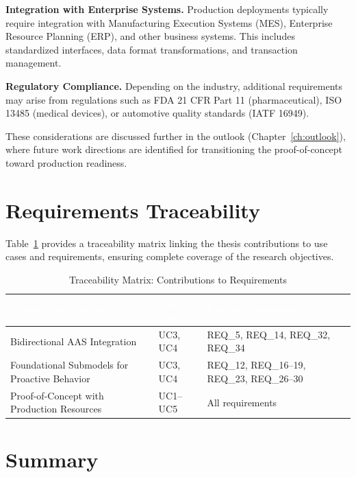\textbf{Integration with Enterprise Systems.} Production deployments typically require integration with Manufacturing Execution Systems (MES), Enterprise Resource Planning (ERP), and other business systems. This includes standardized interfaces, data format transformations, and transaction management.

\textbf{Regulatory Compliance.} Depending on the industry, additional requirements may arise from regulations such as FDA 21 CFR Part 11 (pharmaceutical), ISO 13485 (medical devices), or automotive quality standards (IATF 16949).

These considerations are discussed further in the outlook (Chapter~\ref{ch:outlook}), where future work directions are identified for transitioning the proof-of-concept toward production readiness.

\section{Requirements Traceability}
\label{sec:traceability}

Table~\ref{tab:traceability} provides a traceability matrix linking the thesis contributions to use cases and requirements, ensuring complete coverage of the research objectives.

\begin{table}[ht]
\centering
\caption{Traceability Matrix: Contributions to Requirements}
\label{tab:traceability}
\begin{tabular}{>{\raggedright}p{4.5cm} >{\raggedright}p{3cm} >{\raggedright\arraybackslash}p{5.5cm}}
\toprule
\rowcolor{headerblue}
\textcolor{white}{Thesis Contribution} & \textcolor{white}{Use Cases} & \textcolor{white}{Key Requirements} \\
\midrule
Bidirectional AAS Integration & UC3, UC4 & REQ\_5, REQ\_14, REQ\_32, REQ\_34 \\
\rowcolor{lightgray}
Foundational Submodels for Proactive Behavior & UC3, UC4 & REQ\_12, REQ\_16--19, REQ\_23, REQ\_26--30 \\
Proof-of-Concept with Production Resources & UC1--UC5 & All requirements \\
\bottomrule
\end{tabular}
\end{table}

\section{Summary}
\label{sec:req_summary}

